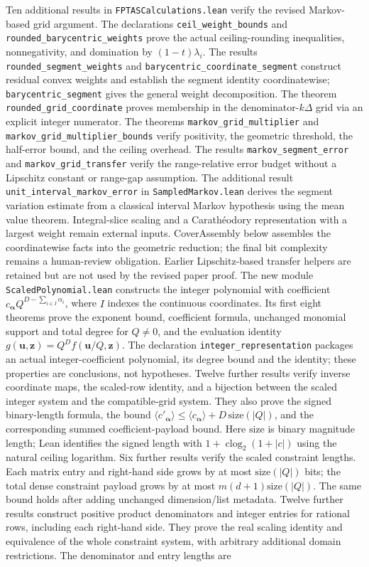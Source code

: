 \documentclass[11pt]{article}
\theoremstyle{definition}\newtheorem{definition}{Definition}[section]
\theoremstyle{remark}\newtheorem{remark}[theorem]{Remark}
\begin{document}
Ten additional results in \texttt{FPTASCalculations.lean} verify the revised Markov-based grid argument. The declarations \texttt{ceil\_weight\_bounds} and \texttt{rounded\_barycentric\_weights} prove the actual ceiling-rounding inequalities, nonnegativity, and domination by $(1-t)\lambda_i$. The results \texttt{rounded\_segment\_weights} and \texttt{barycentric\_coordinate\_segment} construct residual convex weights and establish the segment identity coordinatewise; \texttt{barycentric\_segment} gives the general weight decomposition. The theorem \texttt{rounded\_grid\_coordinate} proves membership in the denominator-$k\Delta$ grid via an explicit integer numerator. The theorems \texttt{markov\_grid\_multiplier} and \texttt{markov\_grid\_multiplier\_bounds} verify positivity, the geometric threshold, the half-error bound, and the ceiling overhead. The results \texttt{markov\_segment\_error} and \texttt{markov\_grid\_transfer} verify the range-relative error budget without a Lipschitz constant or range-gap assumption. The additional result \texttt{unit\_interval\_markov\_error} in \texttt{SampledMarkov.lean} derives the segment variation estimate from a classical interval Markov hypothesis using the mean value theorem. Integral-slice scaling and a Carath\'eodory representation with a largest weight remain external inputs. CoverAssembly below assembles the coordinatewise facts into the geometric reduction; the final bit complexity remains a human-review obligation. Earlier Lipschitz-based transfer helpers are retained but are not used by the revised paper proof. The new module \texttt{ScaledPolynomial.lean} constructs the integer polynomial with coefficient $c_{\boldsymbol{\alpha}} Q^{D-\sum_{i\in I}\alpha_i}$, where $I$ indexes the continuous coordinates. Its first eight theorems prove the exponent bound, coefficient formula, unchanged monomial support and total degree for $Q\ne0$, and the evaluation identity $g(\mathbf u,\mathbf z)=Q^D f(\mathbf u/Q,\mathbf z)$. The declaration \texttt{integer\_\allowbreak representation} packages an actual integer-coefficient polynomial, its degree bound and the identity; these properties are conclusions, not hypotheses. Twelve further results verify inverse coordinate maps, the scaled-row identity, and a bijection between the scaled integer system and the compatible-grid system. They also prove the signed binary-length formula, the bound $\langle c'_{\boldsymbol{\alpha}}\rangle\le\langle c_{\boldsymbol{\alpha}}\rangle+D\,\mathrm{size}(|Q|)$, and the corresponding summed coefficient-payload bound. Here $\mathrm{size}$ is binary magnitude length; Lean identifies the signed length with $1+\operatorname{clog}_2(1+|c|)$ using the natural ceiling logarithm. Six further results verify the scaled constraint lengths. Each matrix entry and right-hand side grows by at most $\mathrm{size}(|Q|)$ bits; the total dense constraint payload grows by at most $m(d+1)\mathrm{size}(|Q|)$. The same bound holds after adding unchanged dimension/list metadata. Twelve further results construct positive product denominators and integer entries for rational rows, including each right-hand side. They prove the real scaling identity and equivalence of the whole constraint system, with arbitrary additional domain restrictions. The denominator and entry lengths are 
\end{document}

